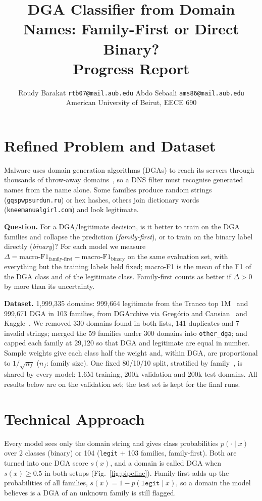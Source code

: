 \documentclass[11pt]{article}
\title{\vspace{-2.4em}\textbf{DGA Classifier from Domain Names: Family-First or Direct Binary?}\\[0.2em]\large Progress Report}
\author{
  Roudy Barakat \quad \texttt{rtb07@mail.aub.edu} \qquad
  Abdo Sebaali \quad \texttt{ams86@mail.aub.edu} \\[0.2em]
  \small American University of Beirut, EECE 690
}
\date{\vspace{-2.2em}}
\begin{document}
\maketitle

\section{Refined Problem and Dataset}
Malware uses domain generation algorithms (DGAs) to reach its servers through
thousands of throw-away domains~\cite{plohmann2016dgarchive}, so a DNS filter must
recognise generated names from the name alone. Some families produce random
strings (\texttt{gqspwpsurdun.ru}) or hex hashes, others join dictionary words
(\texttt{kneemanualgirl.com}) and look legitimate.

\textbf{Question.} For a DGA/legitimate decision, is it better to train on the DGA
families and collapse the prediction (\emph{family-first}), or to train on the
binary label directly (\emph{binary})? For each model we measure
$\Delta = \text{macro-F1}_{\text{family-first}} - \text{macro-F1}_{\text{binary}}$
on the same evaluation set, with everything but the training labels held fixed;
macro-F1 is the mean of the F1 of the DGA class and of the legitimate class.
Family-first counts as better if $\Delta > 0$ by more than its uncertainty.

\textbf{Dataset.} 1{,}999{,}335 domains: 999{,}664 legitimate from the Tranco top
1M~\cite{lepochat2019tranco} and 999{,}671 DGA in 103 families, from
DGArchive via Greg{\'o}rio and Cansian~\cite{gregorio2025dataset,plohmann2016dgarchive}
and Kaggle~\cite{givre2021kaggle}. We removed 330 domains found in both lists,
141 duplicates and 7 invalid strings; merged the 59 families under 300 domains into
\texttt{other\_dga}; and capped each family at 29{,}120 so that DGA and legitimate
are equal in number. Sample weights give each class half the weight and, within
DGA, are proportional to $1/\sqrt{n_f}$ ($n_f$: family size). One fixed 80/10/10
split, stratified by family~\cite{shahzad2021dga}, is shared by every model:
1.6M training, 200k validation and 200k test domains. All results below are on
the validation set; the test set is kept for the final runs.

\section{Technical Approach}
Every model sees only the domain string and gives class probabilities
$p(\cdot \mid x)$ over 2 classes (binary) or 104 (\texttt{legit} + 103 families,
family-first). Both are turned into one DGA score $s(x)$, and a domain is called
DGA when $s(x) \ge 0.5$ in both setups (Fig.~\ref{fig:pipeline}). Family-first
adds up the probabilities of all families, $s(x) = 1 - p(\texttt{legit} \mid x)$,
so a domain the model believes is a DGA of an unknown family is still flagged.
\end{document}
